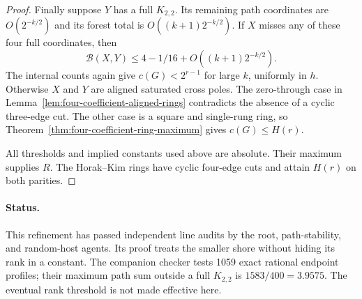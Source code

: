 \begin{proof}
Finally suppose $Y$ has a full $K_{2,2}$.
Its remaining path coordinates are $O(2^{-k/2})$ and its forest total is $O((k+1)2^{-k/2})$.
If $X$ misses any of these four full coordinates, then
\[
 \mathcal B(X,Y)\le4-1/16+O((k+1)2^{-k/2}).
\]
The internal counts again give $c(G)<2^{r-1}$ for large $k$, uniformly in $h$.
Otherwise $X$ and $Y$ are aligned saturated cross poles.
The zero-through case in Lemma~\ref{lem:four-coefficient-aligned-rings} contradicts the absence of a cyclic three-edge cut.
The other case is a square and single-rung ring, so Theorem~\ref{thm:four-coefficient-ring-maximum} gives $c(G)\le H(r)$.

All thresholds and implied constants used above are absolute.
Their maximum supplies $R$.
The Horak--Kim rings have cyclic four-edge cuts and attain $H(r)$ on both parities.
\end{proof}

\paragraph{Status.}
This refinement has passed independent line audits by the root, path-stability, and random-host agents.
Its proof treats the smaller shore without hiding its rank in a constant.
The companion checker tests 1059 exact rational endpoint profiles; their maximum path sum outside a full $K_{2,2}$ is $1583/400=3.9575$.
The eventual rank threshold is not made effective here.
